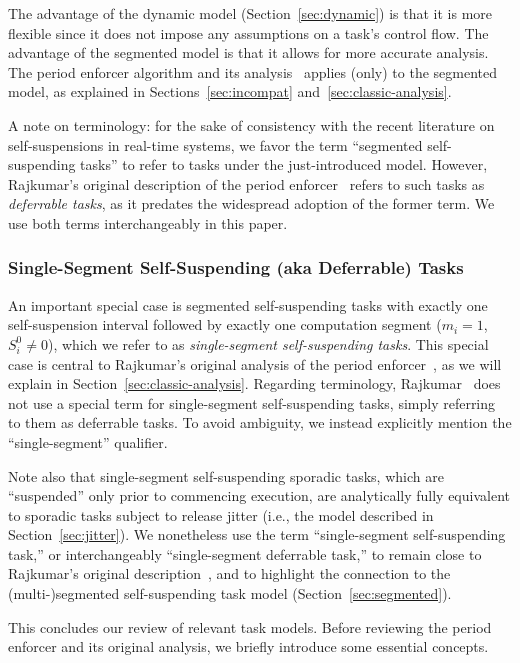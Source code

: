 The advantage of the dynamic model (Section~\ref{sec:dynamic}) is that it is more flexible since it does not impose any assumptions on a task's control flow. The advantage of the segmented model is that it allows for more accurate analysis. The period enforcer algorithm and its analysis~\cite{Raj:suspension1991} applies (only) to the segmented model, as explained in Sections~\ref{sec:incompat} and~\ref{sec:classic-analysis}. 

A note on terminology: for the sake of consistency with the recent literature on self-suspensions in real-time systems, we favor the term ``segmented self-suspending tasks'' to refer to tasks under the just-introduced model. However,  Rajkumar's original description of the period enforcer~\cite{Raj:suspension1991} refers to such tasks as  \emph{deferrable tasks}, as it predates the widespread adoption of the former term. We use both terms interchangeably in this paper.


\subsubsection{Single-Segment Self-Suspending (aka Deferrable) Tasks}
\label{sec:single-segmented}
An important special case is segmented self-suspending tasks with exactly one self-suspension interval followed by exactly one computation segment ($m_i = 1$, $S_i^0 \neq 0$), which we refer to as \emph{single-segment self-suspending tasks}.  This special case is central to Rajkumar's original analysis of the period enforcer~\cite{Raj:suspension1991},  as we will explain in Section~\ref{sec:classic-analysis}.
Regarding terminology, Rajkumar~\cite{Raj:suspension1991} does not use a special term for single-segment self-suspending tasks, simply referring to them as deferrable tasks. To avoid ambiguity, we instead explicitly mention the ``single-segment'' qualifier.  

Note also that single-segment self-suspending sporadic tasks, which are  ``suspended'' only prior to commencing execution, are analytically fully equivalent to sporadic tasks subject to release jitter (i.e., the model described in Section~\ref{sec:jitter}). We nonetheless use the term ``single-segment self-suspending task,'' or interchangeably ``single-segment deferrable task,'' to remain close to Rajkumar's original description~\cite{Raj:suspension1991}, and to highlight the connection to the (multi-)segmented self-suspending task model (Section~\ref{sec:segmented}).

This concludes our review of relevant task models. Before reviewing the period enforcer and its original analysis, we briefly introduce some essential concepts.

